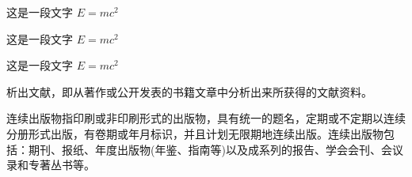 \begin{question}
  这是一段文字 $E = m c^2$
\end{question}

\begin{claim}
  这是一段文字 $E = m c^2$
\end{claim}

\begin{remark}
  这是一段文字 $E = m c^2$
\end{remark}

析出文献，即从著作或公开发表的书籍文章中分析出来所获得的文献资料。

连续出版物指印刷或非印刷形式的出版物，具有统一的题名，定期或不定期以连续分册形式出版，有卷期或年月标识，并且计划无限期地连续出版。连续出版物包括：期刊、报纸、年度出版物(年鉴、指南等)以及成系列的报告、学会会刊、会议录和专著丛书等。
\parencite{李晓东,Ahn,丁文祥,张启发,雷光春,邱泽奇,zhang,唐绪军,昂温,Foth,杨国枢,Morison,张志祥,Aldemita,张凯军,Kosek,文献编写,国防白皮,federal,health,江向东,萧钮,PACS-L}

